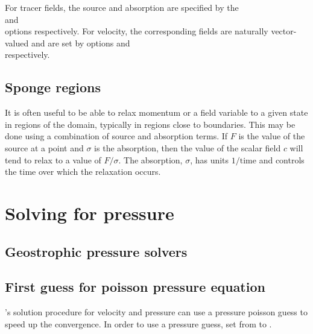 For tracer fields, the source and absorption are specified by the\onlypdf\\
 and\onlypdf\\
 options
respectively. For velocity, the corresponding fields are naturally
vector-valued and are set by options\onlypdf\linebreak
{} and\onlypdf\\
respectively.

\subsection{Sponge regions}\label{Sect:Sponge}
It is often useful to be able to relax momentum or a field variable to a
given state in regions of the domain, typically in regions close to
boundaries. This may be done using a combination of source and absorption
terms. If $F$ is the value of the source at a point and $\sigma$ is the
absorption, then the value of the scalar field $c$ will tend to relax to a value
of $F/\sigma$. The absorption, $\sigma$, has units $1/\mathrm{time}$ and controls the
time over which the relaxation occurs.

\section{Solving for pressure}
\label{sect:configuring_fluidity_pressure}

\subsection{Geostrophic pressure solvers}
\label{Sect:config_geostrophic_balance}

\subsection{First guess for poisson pressure equation} \label{sect:poisson_pressure_solution}
\fluidity's solution procedure for velocity and pressure can use a pressure poisson guess to speed up the convergence. In order to use a pressure guess, set  from  to .


